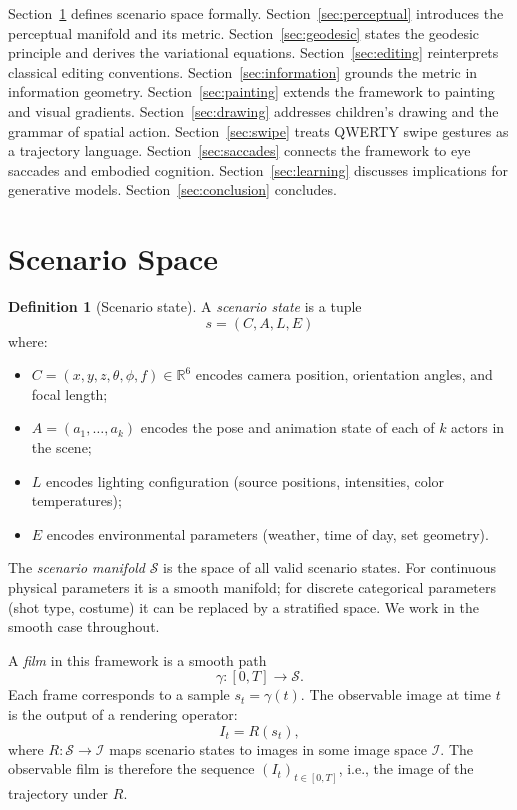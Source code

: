 \documentclass[12pt,a4paper]{article}
\theoremstyle{plain}
\theoremstyle{definition}
\newtheorem{definition}[theorem]{Definition}
\begin{document}
Section~\ref{sec:scenario} defines scenario space formally. Section~\ref{sec:perceptual}
introduces the perceptual manifold and its metric. Section~\ref{sec:geodesic}
states the geodesic principle and derives the variational equations.
Section~\ref{sec:editing} reinterprets classical editing conventions.
Section~\ref{sec:information} grounds the metric in information geometry.
Section~\ref{sec:painting} extends the framework to painting and visual gradients.
Section~\ref{sec:drawing} addresses children's drawing and the grammar of spatial
action. Section~\ref{sec:swipe} treats QWERTY swipe gestures as a trajectory
language. Section~\ref{sec:saccades} connects the framework to eye saccades and
embodied cognition. Section~\ref{sec:learning} discusses implications for
generative models. Section~\ref{sec:conclusion} concludes.

\section{Scenario Space}
\label{sec:scenario}

\begin{definition}[Scenario state]
A \emph{scenario state} is a tuple
\[
s = (C, A, L, E)
\]
where:
\begin{itemize}[nosep]
\item $C = (x,y,z,\theta,\phi,f) \in \mathbb{R}^6$ encodes camera position,
orientation angles, and focal length;
\item $A = (a_1,\dots,a_k)$ encodes the pose and animation state of each of $k$
actors in the scene;
\item $L$ encodes lighting configuration (source positions, intensities, color
temperatures);
\item $E$ encodes environmental parameters (weather, time of day, set geometry).
\end{itemize}
\end{definition}

The \emph{scenario manifold} $\mathcal{S}$ is the space of all valid scenario
states. For continuous physical parameters it is a smooth manifold; for
discrete categorical parameters (shot type, costume) it can be replaced by a
stratified space. We work in the smooth case throughout.

A \emph{film} in this framework is a smooth path
\[
\gamma: [0,T] \to \mathcal{S}.
\]
Each frame corresponds to a sample $s_t = \gamma(t)$. The observable image at
time $t$ is the output of a rendering operator:
\[
I_t = R(s_t),
\]
where $R:\mathcal{S}\to\mathcal{I}$ maps scenario states to images in some image
space $\mathcal{I}$. The observable film is therefore the sequence
$(I_t)_{t\in[0,T]}$, i.e., the image of the trajectory under $R$.
\end{document}
